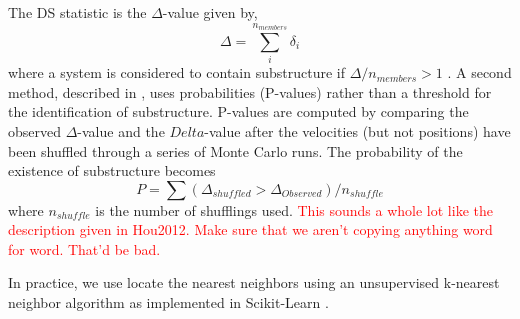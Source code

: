 \documentclass[apj, revtex4]{emulateapj}
\newcommand{\editorial}[1]{\textcolor{red}{#1} }
\begin{document}
The DS statistic is the $\Delta$-value given by, 
\begin{equation}
	\Delta = \sum^{n_{members}}_i \delta_i
\end{equation}
where a system is considered to contain substructure if $\Delta/n_{members} > 1$ \citep{Dressler1988}. A second method, described in \cite{Hou2012}, uses probabilities (P-values) rather than a threshold for the identification of substructure. P-values are computed by comparing the observed $\Delta$-value and the $Delta$-value after the velocities (but not positions) have been shuffled through a series of Monte Carlo runs. The probability of the existence of substructure becomes
\begin{equation}
	P = \sum (\Delta_{shuffled} > \Delta_{Observed}) / n_{shuffle}
\end{equation}
where $n_{shuffle}$ is the number of shufflings used. \editorial{This sounds a whole lot like the description given in Hou2012. Make sure that we aren't copying anything word for word. That'd be bad.}

In practice, we use locate the nearest neighbors using an unsupervised k-nearest neighbor algorithm as implemented in Scikit-Learn \citep{Pedregosa2012}. 


\end{document}
